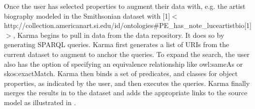 Once the user has selected properties to augment their data with, e.g. the artist biography modeled in the Smithsonian dataset with \scalebox{.6}[1]{$<$}{http://collection.americanart.si.edu/id/ontologies\#PE\_has\_note\_luceartistbio}\scalebox{.6}[1]{$>$}, Karma begins to pull in data from the data repository.
It does so by generating SPARQL queries.  
Karma first generates a list of URIs from the current dataset to augment to anchor the queries.  
To expand the search, the user also has the option of specifying an equivalence relationship like owl:sameAs or skos:exactMatch.  
Karma then binds a set of predicates, and classes for object properties, as indicated by the user, and then executes the queries.  
Karma finally merges the results in to the dataset and adds the appropriate links to the source model as illustrated in %
.  
